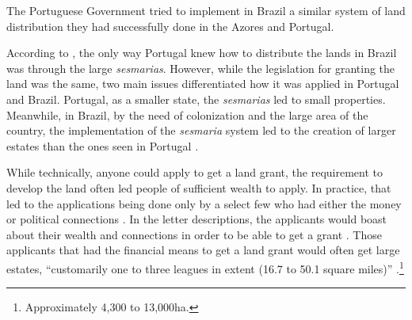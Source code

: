 \documentclass[11pt]{article}
\newcommand{\red}[1]{\textcolor{red}{#1}}
\begin{document}
The Portuguese Government tried to implement in Brazil a similar system of land distribution they had successfully done in the Azores and Portugal.
\begin{comment}
\red{[Add here that it was established in 1375 in Portugal because of the Black Death and the need to repopulate the countryside \parencite{Nozoe2006-hj}]}
\end{comment}
According to \textcite{Smith1944-oi}, the only way Portugal knew how to distribute the lands in Brazil was through the large \textit{sesmarias}.
However, while the legislation for granting the land was the same, two main issues differentiated how it was applied in Portugal and Brazil. 
Portugal, as a smaller state, the \textit{sesmarias} led to small properties. 
Meanwhile, in Brazil, by the need of colonization and the large area of the country, the implementation of the \textit{sesmaria} system led to the creation of larger estates than the ones seen in Portugal \parencites[p.~58-59]{Da_Costa_Porto1979-dz}[p.~28]{Diffie1987-bw}[p.~23-24]{Panini1990-rj}.

While technically, anyone could apply to get a land grant, the requirement to develop the land often led people of sufficient wealth to apply.
In practice, that led to the applications being done only by a select few who had either the money or political connections \parencites[p.~434]{Diffie1987-bw}[p.~80]{Bradford_Burns1993-nw}.
In the letter descriptions, the applicants would boast about their wealth and connections in order to be able to get a grant \parencite[p.~36]{Lima1954-td}. 
Those applicants that had the financial means to get a land grant would often get large estates, ``customarily one to three leagues in extent (16.7 to 50.1 square miles)'' \parencite{Dean1971-iq}.\footnote{Approximately 4,300 to 13,000ha.}
\end{document}
